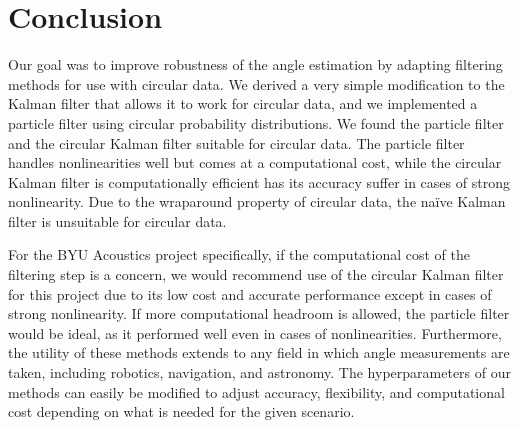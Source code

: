 \documentclass[11pt]{amsart}
\begin{document}
\section{Conclusion}
Our goal was to improve robustness of the angle estimation by adapting filtering methods for use with circular data. We derived a very simple modification to the Kalman filter that 
allows it to work for circular data, and we implemented a particle filter using circular probability distributions. We found the particle filter and the circular Kalman filter suitable 
for circular data. The particle filter handles nonlinearities well but comes at a computational cost, while the circular Kalman filter is computationally efficient has its 
accuracy suffer in cases of strong nonlinearity. Due to the wraparound property of circular data, the naïve Kalman filter is unsuitable for circular data.

For the BYU Acoustics project specifically, if the computational cost of the filtering step is a concern, we would recommend use of the circular Kalman filter for this project due to its low 
cost and accurate performance except in cases of strong nonlinearity. If more computational headroom is allowed, the particle filter would be ideal, as it performed well even in cases of 
nonlinearities. Furthermore, the utility of these methods extends to any field in which angle measurements are taken, including robotics, navigation, and astronomy. The hyperparameters of our 
methods can easily be modified to adjust accuracy, flexibility, and computational cost depending on what is needed for the given scenario. 




\FloatBarrier %
\newpage

\end{document}
